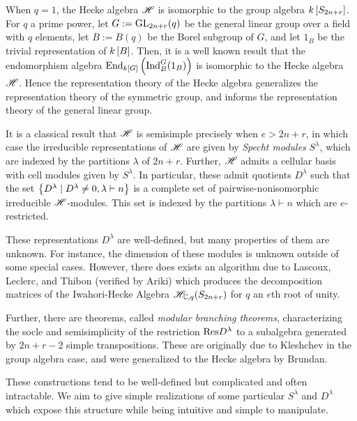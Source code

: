 \documentclass{amsart}
\begin{document}
  \vspace{5pt}
  When $q = 1$, the Hecke algebra $\mathscr{H}$ is isomorphic to the group algebra $k\left[ S_{2n+r} \right]$.
  For $q$ a prime power, let $G := \text{GL}_{2n+r}(q)$ be the general linear group over a field with $q$ elements, let $B := B(q)$ be the Borel subgroup of $G$, and let $1_B$ be the trivial representation of $k\left[ B \right]$.
  Then, it is a well known result that the endomorphism algebra $\text{End}_{k\left[ G \right]} \left( \text{Ind}_B^G(1_B) \right)$ is isomorphic to the Hecke algebra $\mathscr{H}$.\cite{Mathas-book}
  Hence the representation theory of the Hecke algebra generalizes the representation theory of the symmetric group, and informs the representation theory of the general linear group. 

  It is a classical result that $\mathscr{H}$ is semisimple precisely when $e > 2n + r$, in which case the irreducible representations of $\mathscr{H}$ are given by \emph{Specht modules} $S^\lambda$, which are indexed by the partitions $\lambda$ of $2n + r$.
  Further, $\mathscr{H}$ admits a cellular basis with cell modules given by $S^\lambda$.
  In particular, these admit quotients $D^\lambda$ such that the set $\left\{ D^\lambda \mid D^\lambda \neq 0, \lambda \vdash n \right\}$ is a complete set of pairwise-nonisomorphic irreducible $\mathscr{H}$-modules.
  This set is indexed by the partitions $\lambda \vdash n$ which are $e$-restricted.\cite{Murphy1,Murphy2}
  
  These representations $D^\lambda$ are well-defined, but many properties of them are unknown.
  For instance, the dimension of these modules is unknown outside of some special cases.\cite{Mathas-book}
  However, there does exists an algorithm due to Lascoux, Leclerc, and Thibon (verified by Ariki) which produces the decomposition matrices of the Iwahori-Hecke Algebra $\mathscr{H}_{\mathbb{C},q}(S_{2n + r})$ for $q$ an $e$th root of unity.\cite{Ariki,LLT}
  
  Further, there are theorems, called \emph{modular branching theorems}, characterizing the socle and semisimplicity of the restriction $\text{Res} D^\lambda$ to a subalgebra generated by $2n + r - 2$ simple transpositions.
  These are originally due to Kleshchev in the group algebra case, and were generalized to the Hecke algebra by Brundan.\cite{Brundan,Kleshchev} 
  
  These constructions tend to be well-defined but complicated and often intractable.
  We aim to give simple realizations of some particular $S^\lambda$ and $D^\lambda$ which expose this structure while being intuitive and simple to manipulate.
\end{document}

